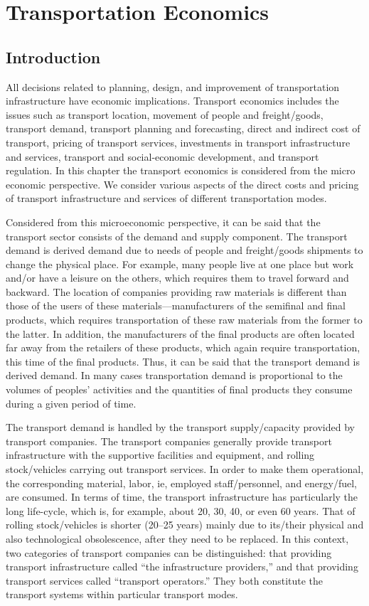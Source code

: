 \chapter{Transportation Economics}
%
\section{Introduction}
All decisions related to planning, design, and improvement of transportation infrastructure have economic implications. Transport economics includes the issues such as transport location, movement of people and freight/goods, transport demand, transport planning and forecasting, direct and indirect cost of transport, pricing of transport services, investments in transport infrastructure and services, transport and social-economic development, and transport regulation. In this chapter the transport economics is considered from the micro economic perspective. We consider various aspects of the direct costs and pricing of transport infrastructure and services of different transportation modes.\\
\par
Considered from this microeconomic perspective, it can be said that the transport sector consists of the demand and supply component. The transport demand is derived demand due to needs of people and freight/goods shipments to change the physical place. For example, many people live at one place but work and/or have a leisure on the others, which requires them to travel forward and backward. The location of companies providing raw materials is different than those of the users of these materials—manufacturers of the semifinal and final products, which requires transportation of these raw materials from the former to the latter. In addition, the manufacturers of the final products are often located far away from the retailers of these products, which again require transportation, this time of the final products. Thus, it can be said that the transport demand is derived demand. In many cases transportation demand is proportional to the volumes of peoples’ activities and the quantities of final products they consume during a given period of time.\\
\par
The transport demand is handled by the transport supply/capacity provided by transport companies.
The transport companies generally provide transport infrastructure with the supportive facilities and equipment, and rolling stock/vehicles carrying out transport services. In order to make them operational, the corresponding material, labor, ie, employed staff/personnel, and energy/fuel, are consumed. In terms of time, the transport infrastructure has particularly the long life-cycle, which is, for example, about 20, 30, 40, or even 60 years. That of rolling stock/vehicles is shorter (20–25 years) mainly due to its/their physical and also technological obsolescence, after they need to be replaced. In this context, two categories of transport companies can be distinguished: that providing transport infrastructure called “the infrastructure providers,” and that providing transport services called “transport operators.” They both constitute the transport systems within particular transport modes.\\
